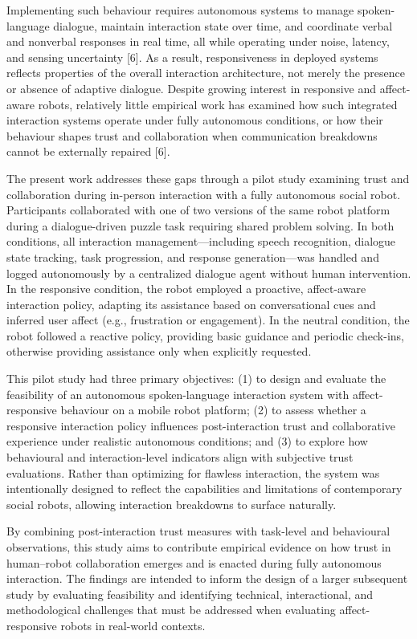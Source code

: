 \documentclass[
  letterpaper,
  DIV=11,
  numbers=noendperiod]{scrartcl}
\begin{document}
Implementing such behaviour requires autonomous systems to manage
spoken-language dialogue, maintain interaction state over time, and
coordinate verbal and nonverbal responses in real time, all while
operating under noise, latency, and sensing uncertainty {[}6{]}. As a
result, responsiveness in deployed systems reflects properties of the
overall interaction architecture, not merely the presence or absence of
adaptive dialogue. Despite growing interest in responsive and
affect-aware robots, relatively little empirical work has examined how
such integrated interaction systems operate under fully autonomous
conditions, or how their behaviour shapes trust and collaboration when
communication breakdowns cannot be externally repaired {[}6{]}.

The present work addresses these gaps through a pilot study examining
trust and collaboration during in-person interaction with a fully
autonomous social robot. Participants collaborated with one of two
versions of the same robot platform during a dialogue-driven puzzle task
requiring shared problem solving. In both conditions, all interaction
management---including speech recognition, dialogue state tracking, task
progression, and response generation---was handled and logged
autonomously by a centralized dialogue agent without human intervention.
In the responsive condition, the robot employed a proactive,
affect-aware interaction policy, adapting its assistance based on
conversational cues and inferred user affect (e.g., frustration or
engagement). In the neutral condition, the robot followed a reactive
policy, providing basic guidance and periodic check-ins, otherwise
providing assistance only when explicitly requested.

This pilot study had three primary objectives: (1) to design and
evaluate the feasibility of an autonomous spoken-language interaction
system with affect-responsive behaviour on a mobile robot platform; (2)
to assess whether a responsive interaction policy influences
post-interaction trust and collaborative experience under realistic
autonomous conditions; and (3) to explore how behavioural and
interaction-level indicators align with subjective trust evaluations.
Rather than optimizing for flawless interaction, the system was
intentionally designed to reflect the capabilities and limitations of
contemporary social robots, allowing interaction breakdowns to surface
naturally.

By combining post-interaction trust measures with task-level and
behavioural observations, this study aims to contribute empirical
evidence on how trust in human--robot collaboration emerges and is
enacted during fully autonomous interaction. The findings are intended
to inform the design of a larger subsequent study by evaluating
feasibility and identifying technical, interactional, and methodological
challenges that must be addressed when evaluating affect-responsive
robots in real-world contexts.
\end{document}
